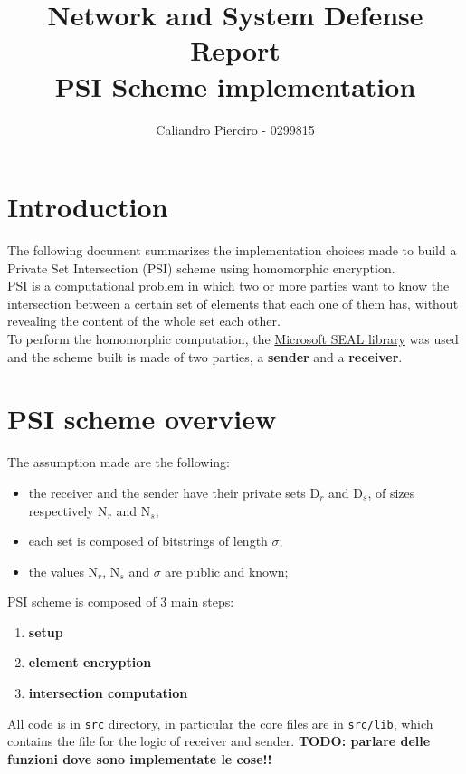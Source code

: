 \documentclass[10pt]{extarticle}
\title{Network and System Defense Report\\PSI Scheme implementation}
\author{Caliandro Pierciro - 0299815}
\begin{document}
\maketitle
\tableofcontents
\newpage

\section{Introduction}
The following document summarizes the implementation choices made to build a Private Set Intersection (PSI) scheme using homomorphic encryption.\\
PSI is a computational problem in which two or more parties want to know the intersection between a certain set of elements that each one of them has, without revealing the content of the whole set each other.\\
To perform the homomorphic computation, the \href{https://github.com/Microsoft/SEAL}{Microsoft SEAL library} was used and the scheme built is made of two parties, a \textbf{sender} and a \textbf{receiver}.
\section{PSI scheme overview}
The assumption made are the following:
\begin{itemize}
	\item the receiver and the sender have their private sets D$_r$ and D$_s$, of sizes respectively N$_r$ and N$_s$;
	\item each set is composed of bitstrings of length $\sigma$;
	\item the values N$_r$, N$_s$ and $\sigma$ are public and known;
\end{itemize}
PSI scheme is composed of 3 main steps:
\begin{enumerate}
	\item \textbf{setup}
	\item \textbf{element encryption}
	\item \textbf{intersection computation}
\end{enumerate}
All code is in \texttt{src} directory, in particular the core files are in \texttt{src/lib}, which contains the file for the logic of receiver and sender.
\textbf{TODO: parlare delle funzioni dove sono implementate le cose!!}
\end{document}
